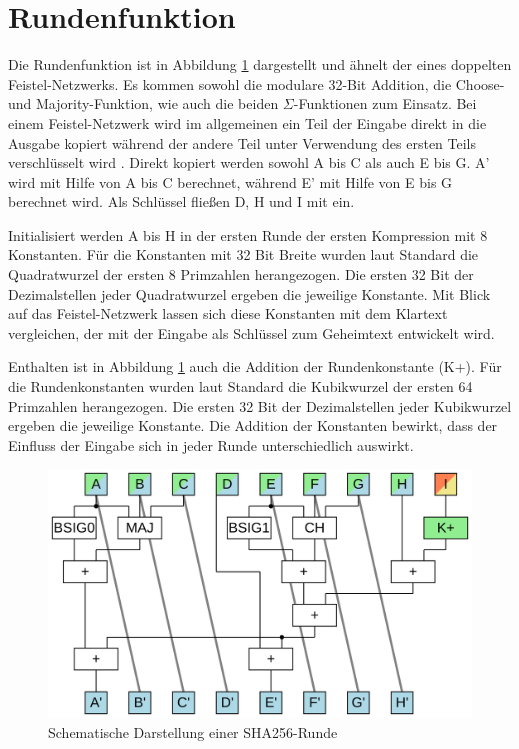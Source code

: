 \section{Rundenfunktion}
\label{sec:sha256:runde}

Die Rundenfunktion ist in Abbildung \ref{fig:sha256core} dargestellt und ähnelt der eines doppelten Feistel-Netzwerks.
Es kommen sowohl die modulare 32-Bit Addition, die Choose- und Majority-Funktion, wie auch die beiden $\Sigma$-Funktionen zum Einsatz.
Bei einem Feistel-Netzwerk wird im allgemeinen ein Teil der Eingabe direkt in die Ausgabe kopiert während der andere
Teil unter Verwendung des ersten Teils verschlüsselt wird \cite[311]{crypto1}. Direkt kopiert werden sowohl A bis C
als auch E bis G. A' wird mit Hilfe von A bis C berechnet, während E' mit Hilfe von E bis G berechnet wird.
Als Schlüssel fließen D, H und I mit ein.

Initialisiert werden A bis H in der ersten Runde der ersten Kompression mit 8 Konstanten. Für die Konstanten mit 32 Bit Breite wurden laut
Standard \cite[10]{nist1804} die Quadratwurzel der ersten 8 Primzahlen herangezogen. Die ersten 32 Bit der Dezimalstellen jeder Quadratwurzel
ergeben die jeweilige Konstante. Mit Blick auf das Feistel-Netzwerk lassen sich diese Konstanten mit dem Klartext vergleichen, der mit der
Eingabe als Schlüssel zum Geheimtext entwickelt wird.

Enthalten ist in Abbildung \ref{fig:sha256core} auch die Addition der Rundenkonstante (K+). Für die Rundenkonstanten wurden laut Standard
\cite[10]{nist1804} die Kubikwurzel der ersten 64 Primzahlen herangezogen. Die ersten 32 Bit der Dezimalstellen jeder Kubikwurzel ergeben
die jeweilige Konstante. Die Addition der Konstanten bewirkt, dass der Einfluss der Eingabe sich in jeder Runde unterschiedlich auswirkt.

\begin{figure}[!h]
  \centering
  \includegraphics[scale=0.4]{images/sha256core}
  \caption{Schematische Darstellung einer SHA256-Runde}
  \label{fig:sha256core}
\end{figure}
